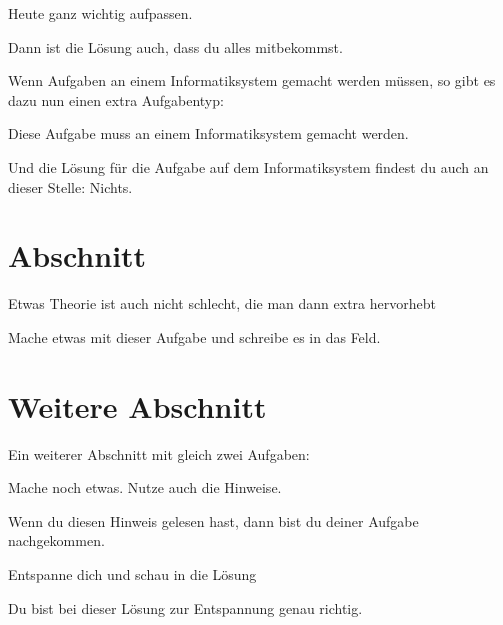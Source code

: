 \documentclass[12pt,a4paper,parskip=half,chapterprefix,bibliography=totoc,footheight=57pt,numbers=noendperiod]{scrreprt}
\begin{document}
    \begin{aufgabe}
        Heute ganz wichtig aufpassen.
    \end{aufgabe}
    \begin{loesung}
        Dann ist die Lösung auch, dass du alles mitbekommst.
    \end{loesung}


    Wenn Aufgaben an einem Informatiksystem gemacht werden müssen, so gibt es dazu nun einen extra Aufgabentyp:

    \begin{aufgabe}[pcAufgabe]
        Diese Aufgabe muss an einem Informatiksystem gemacht werden.
    \end{aufgabe}
    \begin{loesung}
        Und die Lösung für die Aufgabe auf dem Informatiksystem findest du auch an dieser Stelle: Nichts.
    \end{loesung}




    \section{Abschnitt}
        \blindtext

        \begin{theorieBox}
            Etwas Theorie ist auch nicht schlecht, die man dann extra hervorhebt
        \end{theorieBox}


        \blindtext

        \begin{aufgabe}
            Mache etwas mit dieser Aufgabe und schreibe es in das Feld.
            \TextFeld{3cm}
        \end{aufgabe}

    \section{Weitere Abschnitt}
        Ein weiterer Abschnitt mit gleich zwei Aufgaben:
        \begin{aufgabe}
            Mache noch etwas. Nutze auch die Hinweise.
            \begin{bearbeitungshinweis}
                Wenn du diesen Hinweis gelesen hast, dann bist du deiner Aufgabe nachgekommen.
            \end{bearbeitungshinweis}
        \end{aufgabe}
        \begin{aufgabe}
            Entspanne dich und schau in die Lösung
        \end{aufgabe}
        \begin{loesung}
            Du bist bei dieser Lösung zur Entspannung genau richtig.
        \end{loesung}
\end{document}
